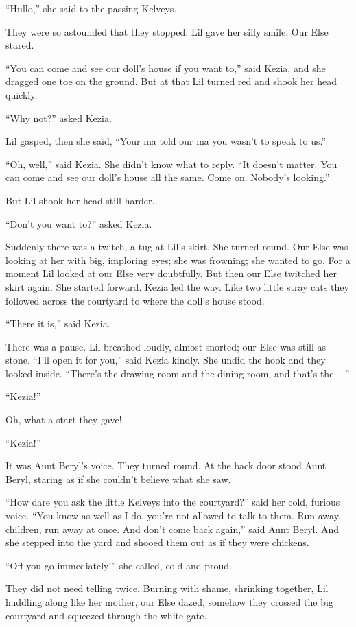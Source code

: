 \documentclass[10pt,a4paper]{article}
\begin{document}
“Hullo,” she said to the passing Kelveys.

They were so astounded that they stopped. Lil gave her silly smile. Our Else stared.

“You can come and see our doll’s house if you want to,” said Kezia, and she dragged one toe on the ground. But at that Lil turned red and shook her head quickly.

“Why not?” asked Kezia.

Lil gasped, then she said, “Your ma told our ma you wasn’t to speak to us.”

“Oh, well,” said Kezia. She didn’t know what to reply. “It doesn’t matter. You can come and see our doll’s house all the same. Come on. Nobody’s looking.”

But Lil shook her head still harder.

“Don’t you want to?” asked Kezia.

Suddenly there was a twitch, a tug at Lil’s skirt. She turned round. Our Else was looking at her with big, imploring eyes; she was frowning; she wanted to go. For a moment Lil looked at our Else very doubtfully. But then our Else twitched her skirt again. She started forward. Kezia led the way. Like two little stray cats they followed across the courtyard to where the doll’s house stood.

“There it is,” said Kezia.

There was a pause. Lil breathed loudly, almost snorted; our Else was still as stone. “I’ll open it for you,” said Kezia kindly. She undid the hook and they looked inside. “There’s the drawing-room and the dining-room, and that’s the – ”

“Kezia!”

Oh, what a start they gave!

“Kezia!”

It was Aunt Beryl’s voice. They turned round. At the back door stood Aunt Beryl, staring as if she couldn’t believe what she saw.

“How dare you ask the little Kelveys into the courtyard?” said her cold, furious voice. “You know as well as I do, you’re not allowed to talk to them. Run away, children, run away at once. And don’t come back again,” said Aunt Beryl. And she stepped into the yard and shooed them out as if they were chickens.

“Off you go immediately!” she called, cold and proud.

They did not need telling twice. Burning with shame, shrinking together, Lil huddling along like her mother, our Else dazed, somehow they crossed the big courtyard and squeezed through the white gate.
\end{document}

